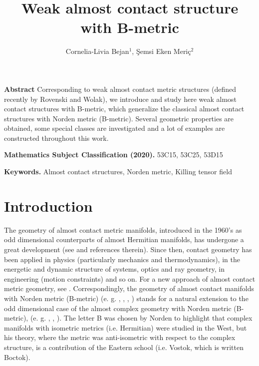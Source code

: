 \documentclass{article}
\begin{document}
\title{\textbf{Weak almost contact structure with B-metric  }}
\author{Cornelia-Livia Bejan$^{1}$, \c{S}emsi Eken Meri\c{c}$^{2}$}
\date{\vspace{-5ex}}
\maketitle




\bigskip

\textbf{Abstract} Corresponding to weak almost contact metric structures (defined recently by Rovenski and Wolak), we introduce and study here weak almost contact structures with B-metric, which generalize the classical almost contact structures with Norden metric (B-metric). Several geometric properties are obtained, some special classes are investigated and a lot of examples are constructed throughout this work.



\bigskip

\noindent\textbf{Mathematics Subject Classification (2020).} 53C15, 53C25, 53D15 \medskip

\noindent\textbf{Keywords.} Almost contact structures, Norden metric, Killing tensor field
\medskip

\section{Introduction}

The geometry of almost contact  metric manifolds, introduced in the 1960{'}s as odd dimensional counterparts of almost Hermitian manifolds, has undergone a great development (see \cite{Blair} and references therein). Since then, contact geometry has been applied in physics (particularly mechanics and thermodynamics), in the energetic and dynamic structure of systems, optics and ray geometry, in engineering (motion constraints) and so on. For a new approach of almost contact metric geometry, see \cite{Ilka}. Correspondingly, the geometry of almost contact manifolds with Norden metric (B-metric) (e. g. \cite{Ganchev1}, \cite{Ivanov}, \cite{Manev2}, \cite{Nakova}) stands for a natural extension to the odd dimensional case of the almost complex geometry with Norden metric (B-metric), (e. g. \cite{Ganchev}, \cite{Norden}, \cite{Oproiu}). The letter B was chosen by Norden to highlight that complex manifolds with isometric metrics (i.e. Hermitian) were studied in the West, but his theory, where the metric was anti-isometric with respect to the complex structure, is a contribution of the Eastern school (i.e. Vostok, which is written Boctok). \medskip																									
\end{document}
